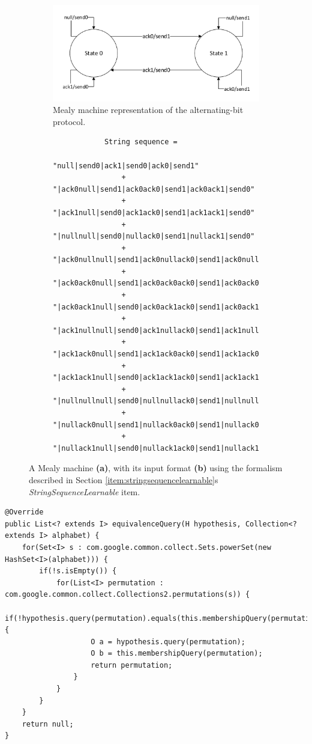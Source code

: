 \begin{figure}[H]
	\centering
	\begin{subfigure}{0.5\linewidth}
		\centering
		\includegraphics[width=1.0\linewidth]{figures/alternatingbit}
		\caption{Mealy machine representation of the alternating-bit protocol.}
	\end{subfigure}
	\begin{subfigure}{0.8\linewidth}
		\centering
		\begin{lstlisting}
			String sequence = 
				"null|send0|ack1|send0|ack0|send1"
				+ "|ack0null|send1|ack0ack0|send1|ack0ack1|send0"
				+ "|ack1null|send0|ack1ack0|send1|ack1ack1|send0"
				+ "|nullnull|send0|nullack0|send1|nullack1|send0"
				+ "|ack0nullnull|send1|ack0nullack0|send1|ack0nullack1|send0"
				+ "|ack0ack0null|send1|ack0ack0ack0|send1|ack0ack0ack1|send0"
				+ "|ack0ack1null|send0|ack0ack1ack0|send1|ack0ack1ack1|send0"
				+ "|ack1nullnull|send0|ack1nullack0|send1|ack1nullack1|send0"
				+ "|ack1ack0null|send1|ack1ack0ack0|send1|ack1ack0ack1|send0"
				+ "|ack1ack1null|send0|ack1ack1ack0|send1|ack1ack1ack1|send0"
				+ "|nullnullnull|send0|nullnullack0|send1|nullnullack1|send0"
				+ "|nullack0null|send1|nullack0ack0|send1|nullack0ack1|send0"
				+ "|nullack1null|send0|nullack1ack0|send1|nullack1ack1|send0";
		\end{lstlisting}
		\caption{}
	\end{subfigure}
	\caption{A Mealy machine \textbf{(a)}, with its input format \textbf{(b)} using the formalism described in Section \ref{item:stringsequencelearnable}s \emph{StringSequenceLearnable} item.}
	\label{fig:alternatingbit}
\end{figure}


\begin{lstlisting}[caption=Brute-force implementation of equivalence queries described in Section \ref{item:stringsequencelearnable}s \emph{StringSequenceAdapter} item using google guavas Sets.powerSet() function.,label=li:eqbruteforce,float,floatplacement=H]
@Override
public List<? extends I> equivalenceQuery(H hypothesis, Collection<? extends I> alphabet) {
	for(Set<I> s : com.google.common.collect.Sets.powerSet(new HashSet<I>(alphabet))) {
		if(!s.isEmpty()) {
			for(List<I> permutation : com.google.common.collect.Collections2.permutations(s)) {
				if(!hypothesis.query(permutation).equals(this.membershipQuery(permutation))) {
					O a = hypothesis.query(permutation);
					O b = this.membershipQuery(permutation);
					return permutation;
				}
			}
		}
	}
	return null;
}
\end{lstlisting}


